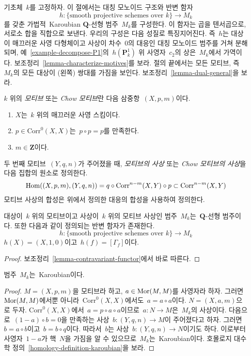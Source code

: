 \noindent
기초체\  $k$를 고정하자. 이 절에서는 대칭 모노이드 구조와 반변 함자
$$
h : \{\text{smooth projective schemes over }k\} \longrightarrow M_k
$$
를 갖춘 가법적\  Karoubian $\mathbf{Q}$-선형 범주\  $M_k$를 구성한다.
이 함자는 곱을 텐서곱으로, 서로소 합을 직합으로 보낸다.
우리의 구성은 다음 성질로 특징지어진다. 즉\  $h$는 대상이 매끄러운
사영 다형체이고 사상이 차수\  $0$의 대응인 대칭 모노이드 범주를 거쳐
분해되며, 예\  \ref{example-decompose-P1}의\ 
$h(\mathbf{P}^1_k)$ 위 사영자\  $c_2$의 상은\  $M_k$에서 가역이다.
보조정리\  \ref{lemma-characterize-motives}를 보라.
절의 끝에서는 모든 모티브, 즉\  $M_k$의 모든 대상이 (왼쪽) 쌍대를
가짐을 보인다. 보조정리\  \ref{lemma-dual-general}을 보라.

\medskip\noindent
$k$ 위의 {\it 모티브} 또는 {\it Chow 모티브}란 다음 삼중항\ 
$(X, p, m)$이다.
\begin{enumerate}
\item $X$는\  $k$ 위의 매끄러운 사영 스킴이다.
\item $p \in \text{Corr}^0(X, X)$는\  $p \circ p = p$를 만족한다.
\item $m \in \mathbf{Z}$이다.
\end{enumerate}
두 번째 모티브\  $(Y, q, n)$가 주어졌을 때, {\it 모티브의 사상} 또는
{\it Chow 모티브의 사상}을 다음 집합의 원소로 정의한다.
$$
\mathop{\mathrm{Hom}}\nolimits((X, p, m), (Y, q, n)) =
q \circ \text{Corr}^{n - m}(X, Y) \circ p \subset \text{Corr}^{n - m}(X, Y)
$$
모티브 사상의 합성은 위에서 정의한 대응의 합성을 사용하여 정의한다.

\begin{lemma}
\label{lemma-motives}
대상이\  $k$ 위의 모티브이고 사상이\  $k$ 위의 모티브 사상인 범주\ 
$M_k$는\  $\mathbf{Q}$-선형 범주이다. 또한 다음과 같이 정의되는
반변 함자가 존재한다.
$$
h : \{\text{smooth projective schemes over }k\} \longrightarrow M_k
$$
$h(X) = (X, 1, 0)$이고\  $h(f) = [\Gamma_f]$이다.
\end{lemma}

\begin{proof}
보조정리\  \ref{lemma-contravariant-functor}에서 바로 따른다.
\end{proof}

\begin{lemma}
\label{lemma-Karoubian}
범주\  $M_k$는\  Karoubian이다.
\end{lemma}

\begin{proof}
$M = (X, p, m)$을 모티브라 하고, $a \in \mathop{\mathrm{Mor}}\nolimits(M, M)$를 사영자라 하자.
그러면\  $\mathop{\mathrm{Mor}}\nolimits(M, M)$에서뿐 아니라\  $\text{Corr}^0(X, X)$에서도\ 
$a = a \circ a$이다. $N = (X, a, m)$으로 두자.
$\text{Corr}^0(X, X)$에서\  $a = p \circ a \circ a$이므로\ 
$a : N \to M$은\  $M_k$의 사상이다.
다음으로\  $(1 - a) \circ b = 0$을 만족하는 사상\ 
$b : (Y, q, n) \to M$이 주어졌다고 하자. 그러면\ 
$b = a \circ b$이고\  $b = b \circ q$이다. 따라서\  $b$는 사상\ 
$b : (Y, q, n) \to N$이기도 하다. 이로부터 사영자\  $1 - a$가
핵\  $N$을 가짐을 알 수 있으므로\  $M_k$는\  Karoubian이다.
호몰로지 대수학 정의\  \ref{homology-definition-karoubian}을 보라.
\end{proof}

